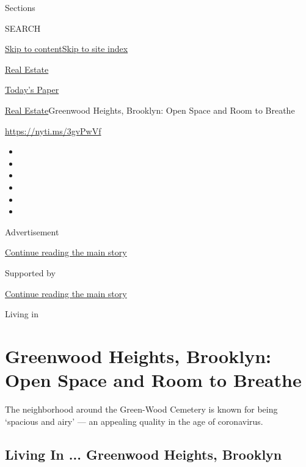 Sections

SEARCH

\protect\hyperlink{site-content}{Skip to
content}\protect\hyperlink{site-index}{Skip to site index}

\href{https://www.nytimes3xbfgragh.onion/section/realestate}{Real
Estate}

\href{https://myaccount.nytimes3xbfgragh.onion/auth/login?response_type=cookie\&client_id=vi}{}

\href{https://www.nytimes3xbfgragh.onion/section/todayspaper}{Today's
Paper}

\href{/section/realestate}{Real Estate}\textbar{}Greenwood Heights,
Brooklyn: Open Space and Room to Breathe

\url{https://nyti.ms/3gvPwVf}

\begin{itemize}
\item
\item
\item
\item
\item
\item
\end{itemize}

Advertisement

\protect\hyperlink{after-top}{Continue reading the main story}

Supported by

\protect\hyperlink{after-sponsor}{Continue reading the main story}

Living in

\hypertarget{greenwood-heights-brooklyn-open-space-and-room-to-breathe}{%
\section{Greenwood Heights, Brooklyn: Open Space and Room to
Breathe}\label{greenwood-heights-brooklyn-open-space-and-room-to-breathe}}

The neighborhood around the Green-Wood Cemetery is known for being
`spacious and airy' --- an appealing quality in the age of coronavirus.

\href{https://www.nytimes3xbfgragh.onion/slideshow/2020/08/05/realestate/living-in-greenwood-heights-brooklyn.html}{}

\hypertarget{living-in--greenwood-heights-brooklyn}{%
\subsection{Living In ... Greenwood Heights,
Brooklyn}\label{living-in--greenwood-heights-brooklyn}}

